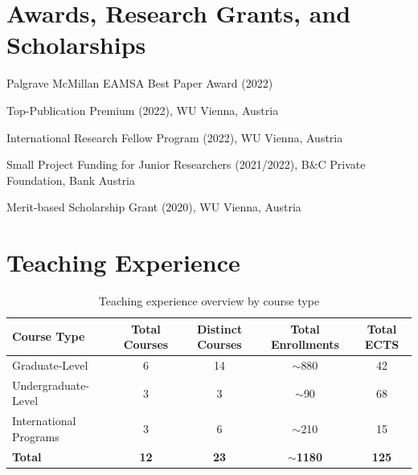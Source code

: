 \documentclass[11pt,a4paper]{article}
\begin{document}
\begin{cv}
\section{Awards, Research Grants, and Scholarships}
\begin{cvlist}{}
  \item[finalist] Palgrave McMillan EAMSA Best Paper Award (2022)
  \item[EUR 1000] Top-Publication Premium (2022), WU Vienna, Austria 
  \item[EUR 2300] International Research Fellow Program (2022), WU Vienna, Austria
  \item[EUR 8000] Small Project Funding for Junior Researchers (2021/2022), B\&C Private Foundation, Bank Austria
  \item[EUR 1000] Merit-based Scholarship Grant (2020), WU Vienna, Austria
\end{cvlist}

\section{Teaching Experience}

\begin{table}[!ht]
\centering
\begin{tabular}{l|c|c|c|c}
\hline
Course Type & Total Courses & Distinct Courses & Total Enrollments & Total ECTS \\ \hline
Graduate-Level & 6 & 14 & $\sim$880 & 42 \\ 
Undergraduate-Level  & 3 & 3 & $\sim$90 & 68 \\ 
International Programs & 3 & 6 & $\sim$210 & 15 \\ \hline
\textbf{Total} & \textbf{12} & \textbf{23} & \textbf{$\sim$1180} & \textbf{125} \\ \hline
\end{tabular}
\caption{Teaching experience overview by course type}
\end{table}


\end{cv}
\end{document}
